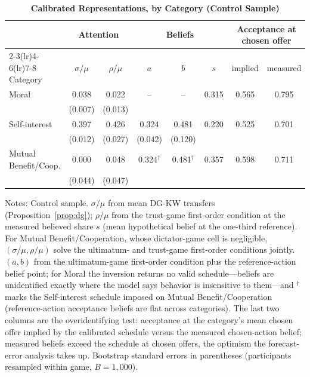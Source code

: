 \begin{table}[!htbp]
\centering
\footnotesize
\renewcommand{\arraystretch}{1.15}
\caption{\textbf{Calibrated Representations, by Category (Control Sample)}}
\label{tab:calibration_p1}
\begin{tabular}{l cc cc c cc}
\toprule
& \multicolumn{2}{c}{Attention} & \multicolumn{3}{c}{Beliefs} & \multicolumn{2}{c}{Acceptance at chosen offer} \\
\cmidrule(lr){2-3}\cmidrule(lr){4-6}\cmidrule(lr){7-8}
Category & $\sigma/\mu$ & $\rho/\mu$ & $a$ & $b$ & $s$ & implied & measured \\
\midrule
Moral & 0.038 & 0.022 & -- & -- & 0.315 & 0.565 & 0.795 \\
 & (0.007) & (0.013) &  &  & & & \\
Self-interest & 0.397 & 0.426 & 0.324 & 0.481 & 0.220 & 0.525 & 0.701 \\
 & (0.012) & (0.027) & (0.042) & (0.120) & & & \\
Mutual Benefit/Coop. & 0.000 & 0.048 & 0.324$^{\dagger}$ & 0.481$^{\dagger}$ & 0.357 & 0.598 & 0.711 \\
 & (0.044) & (0.047) &  &  & & & \\
\bottomrule
\end{tabular}
\begin{flushleft}
\footnotesize Notes: Control sample. $\sigma/\mu$ from mean DG-KW transfers (Proposition~\ref{prop:dg}); $\rho/\mu$ from the trust-game first-order condition at the measured believed share $s$ (mean hypothetical belief at the one-third reference). For Mutual Benefit/Cooperation, whose dictator-game cell is negligible, $(\sigma/\mu,\rho/\mu)$ solve the ultimatum- and trust-game first-order conditions jointly. $(a,b)$ from the ultimatum-game first-order condition plus the reference-action belief point; for Moral the inversion returns no valid schedule---beliefs are unidentified exactly where the model says behavior is insensitive to them---and $^{\dagger}$ marks the Self-interest schedule imposed on Mutual Benefit/Cooperation (reference-action acceptance beliefs are flat across categories). The last two columns are the overidentifying test: acceptance at the category's mean chosen offer implied by the calibrated schedule versus the measured chosen-action belief; measured beliefs exceed the schedule at chosen offers, the optimism the forecast-error analysis takes up. Bootstrap standard errors in parentheses (participants resampled within game, $B=1{,}000$).
\end{flushleft}
\end{table}
